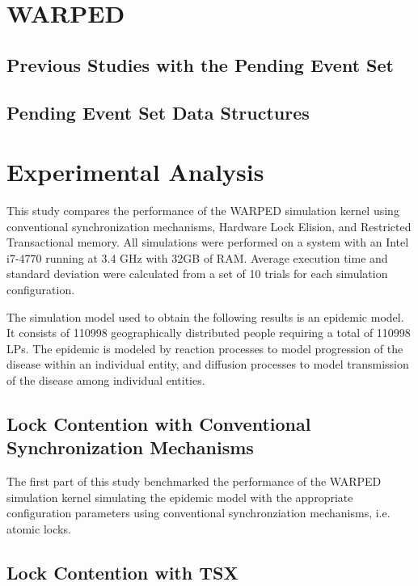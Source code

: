 \documentclass[a4paper]{article}
\begin{document}
\section{\textbf{WARPED}}

\subsection{\textbf{Previous Studies with the Pending Event Set}}

\subsection{\textbf{Pending Event Set Data Structures}}

\newpage
\section{\textbf{Experimental Analysis}}

\indent This study compares the performance of the WARPED simulation kernel
using conventional synchronization mechanisms, Hardware Lock Elision, and
Restricted Transactional memory.  All simulations were performed on a system
with an Intel i7-4770 running at 3.4 GHz with 32GB of RAM.  Average execution
time and standard deviation were calculated from a set of 10 trials for each
simulation configuration.\par

\indent The simulation model used to obtain the following results is an epidemic
model.  It consists of 110998 geographically distributed people
requiring a total of 110998 LPs.  The epidemic is modeled by reaction processes
to model progression of the disease within an individual entity, and diffusion
processes to model transmission of the disease among individual entities.\par

\subsection{\textbf{Lock Contention with Conventional Synchronization
Mechanisms}}

\indent The first part of this study benchmarked the performance of the WARPED
simulation kernel simulating the epidemic model with the appropriate
configuration parameters using conventional synchronziation mechanisms, i.e.
atomic locks.

\subsection{\textbf{Lock Contention with TSX}}
\end{document}
